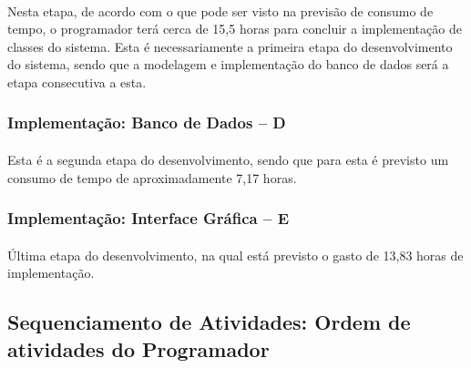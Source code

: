 \documentclass[12pt,a4paper]{article}
\begin{document}
		\paragraph{} Nesta etapa, de acordo com o que pode ser visto na previsão de consumo de tempo, o programador terá cerca de 15,5 horas para concluir a implementação de classes do sistema. Esta é necessariamente a primeira etapa do desenvolvimento do sistema, sendo que a modelagem e implementação do banco de dados será a etapa consecutiva a esta.
		\subsubsection{Implementação: Banco de Dados -- D}
		\paragraph{} Esta é a segunda etapa do desenvolvimento, sendo que para esta é previsto um consumo de tempo de aproximadamente 7,17 horas. 
		\subsubsection{Implementação: Interface Gráfica -- E}
		\paragraph{} Última etapa do desenvolvimento, na qual está previsto o gasto de 13,83 horas de implementação.
		\subsection{Sequenciamento de Atividades: Ordem de atividades do Programador}
\end{document}
